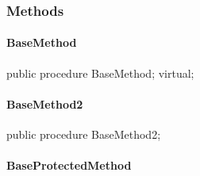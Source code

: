 \documentclass{report}
\begin{document}
\subsubsection*{\large{\textbf{Methods}}\normalsize\hspace{1ex}\hfill}
\paragraph*{BaseMethod}\hspace*{\fill}

\begin{list}{}{
\setlength{\itemindent}{0cm}
\setlength{\listparindent}{0cm}
\setlength{\leftmargin}{\evensidemargin}
\addtolength{\leftmargin}{\tmplength}
\settowidth{\labelsep}{X}
\addtolength{\leftmargin}{\labelsep}
\setlength{\labelwidth}{\tmplength}
}
\begin{flushleft}
\item[\textbf{Declaration}\hfill]
\begin{ttfamily}
public procedure BaseMethod; virtual;\end{ttfamily}


\end{flushleft}
\end{list}
\paragraph*{BaseMethod2}\hspace*{\fill}

\begin{list}{}{
\setlength{\itemindent}{0cm}
\setlength{\listparindent}{0cm}
\setlength{\leftmargin}{\evensidemargin}
\addtolength{\leftmargin}{\tmplength}
\settowidth{\labelsep}{X}
\addtolength{\leftmargin}{\labelsep}
\setlength{\labelwidth}{\tmplength}
}
\begin{flushleft}
\item[\textbf{Declaration}\hfill]
\begin{ttfamily}
public procedure BaseMethod2;\end{ttfamily}


\end{flushleft}
\end{list}
\paragraph*{BaseProtectedMethod}\hspace*{\fill}
\end{document}
